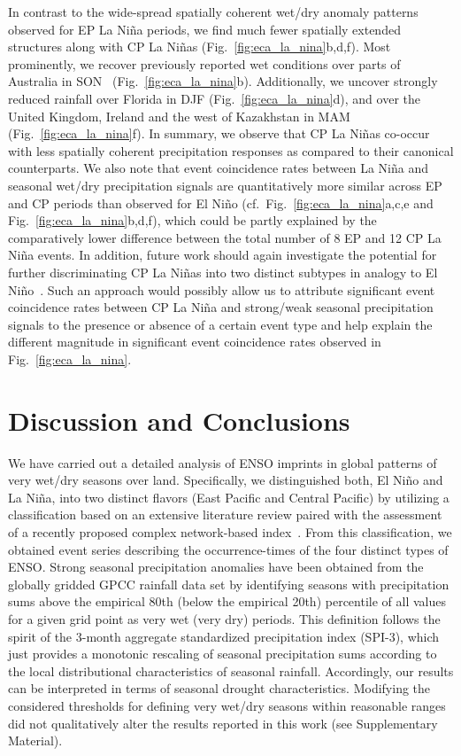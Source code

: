 \documentclass[utf8]{frontiersSCNS} %
\begin{document}
In contrast to the wide-spread spatially coherent wet/dry anomaly patterns observed for EP La Ni\~na periods, we find much fewer spatially extended structures along with CP La Ni\~nas (Fig.~\ref{fig:eca_la_nina}b,d,f). Most prominently, we recover previously reported wet conditions over parts of Australia in SON~\citep{arblaster_interdecadal_2002, cai_ninmodoki_2009} (Fig.~\ref{fig:eca_la_nina}b). Additionally, we uncover strongly reduced rainfall over Florida in DJF (Fig.~\ref{fig:eca_la_nina}d), and over the United Kingdom, Ireland and the west of Kazakhstan in MAM (Fig.~\ref{fig:eca_la_nina}f). In summary, we observe that CP La Ni\~nas co-occur with less spatially coherent precipitation responses as compared to their canonical counterparts. We also note that event coincidence rates between La Ni\~na and seasonal wet/dry precipitation signals are quantitatively more similar across EP and CP periods than observed for El Ni\~no (cf.\ Fig.~\ref{fig:eca_la_nina}a,c,e and Fig.~\ref{fig:eca_la_nina}b,d,f), which could be partly explained by the comparatively lower difference between the total number of 8 EP and 12 CP La Ni\~na events. In addition, future work should again investigate the potential for further discriminating CP La Ni\~nas into two distinct subtypes in analogy to El Ni\~no~\citep{wang2013classifying, wang2014different, wang2018new}. Such an approach would possibly allow us to attribute significant event coincidence rates between CP La Ni\~na and strong/weak seasonal precipitation signals to the presence or absence of a certain event type and help explain the different magnitude in significant event coincidence rates observed in Fig.~\ref{fig:eca_la_nina}.

\section{Discussion and Conclusions}\label{sec:conclusion}

We have carried out a detailed analysis of ENSO imprints in global patterns of very wet/dry seasons over land. Specifically, we distinguished both, El Ni\~no and La Ni\~na, into two distinct flavors (East Pacific and Central Pacific) by utilizing a classification based on an extensive literature review paired with the assessment of a recently proposed complex network-based index~\citep{wiedermann_climate_2016}. From this classification, we obtained event series describing the occurrence-times of the four distinct types of ENSO. Strong seasonal precipitation anomalies have been obtained from the globally gridded GPCC rainfall data set by identifying seasons with precipitation sums above the empirical 80th (below the empirical 20th) percentile of all values for a given grid point as very wet (very dry) periods. This definition follows the spirit of the 3-month aggregate standardized precipitation index (SPI-3), which just provides a monotonic rescaling of seasonal precipitation sums according to the local distributional characteristics of seasonal rainfall. Accordingly, our results can be interpreted in terms of seasonal drought characteristics. Modifying the considered thresholds for defining very wet/dry seasons within reasonable ranges did not qualitatively alter the results reported in this work (see Supplementary Material).
\end{document}

